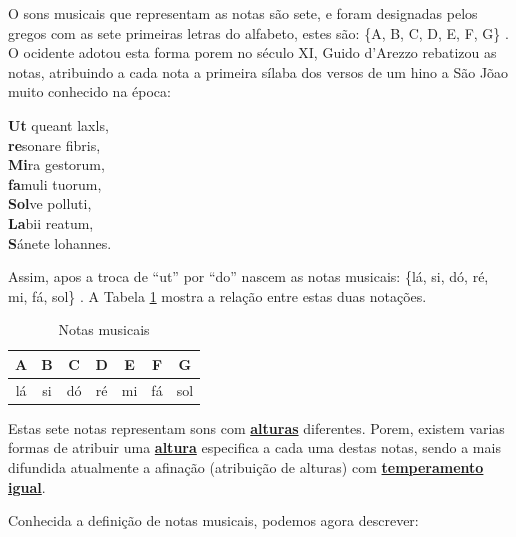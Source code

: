 O sons musicais que representam as notas são sete, 
e foram designadas pelos gregos com as sete primeiras letras do alfabeto,
estes são: \{A, B, C, D, E, F, G\} \cite[pp. 11]{grabner2001teoria} \cite[pp. 9]{cardoso1973curso}.
O ocidente adotou esta forma porem no século XI, 
Guido d'Arezzo rebatizou as notas, 
atribuindo a cada nota a primeira sílaba dos versos
de um hino a São Jõao muito conhecido na época:
\begin{citando}%
\textbf{Ut} queant laxls,\\
\textbf{re}sonare fibris,\\
\textbf{Mi}ra gestorum,\\
\textbf{fa}muli tuorum,\\
\textbf{Sol}ve polluti,\\
\textbf{La}bii reatum,\\
\textbf{S}ánete lohannes.
\end{citando}
 Assim, apos a troca de ``ut'' por ``do'' nascem as notas musicais: 
\{lá, si, dó, ré, mi, fá, sol\} \cite[pp. 21]{arbones2012armonia} \cite[pp. 7]{cardoso1973curso}. 
A Tabela \ref{tab:notasmusic} mostra a relação entre estas duas notações.

\begin{table}[h]
\centering
\begin{tabular}{|c|c|c|c|c|c|c|}
\hline
A  & B  & C  & D  & E  & F  & G\\ \hline
lá & si & dó & ré & mi & fá & sol \\ \hline
\end{tabular}
\caption{Notas musicais}
\label{tab:notasmusic}
\end{table}

Estas sete notas representam sons com \hyperref[sec:pos:Altura]{\textbf{alturas}} diferentes.
Porem, existem varias formas de atribuir uma \hyperref[sec:pos:Altura]{\textbf{altura}} 
especifica a cada uma destas notas, 
sendo a mais difundida atualmente a afinação (atribuição de alturas) com \hyperref[subsec:tempigual]{\textbf{temperamento igual}}.




Conhecida a definição de notas musicais, podemos agora descrever:


